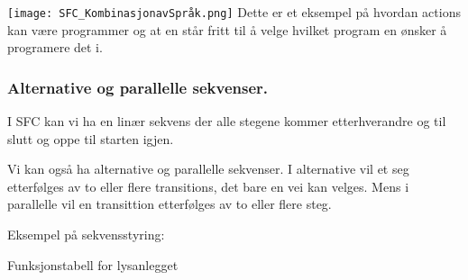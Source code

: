\texttt{[image: SFC\_KombinasjonavSpråk.png]}
\vskip 2.5pt 
Dette er et eksempel på hvordan actions kan være programmer og at en står fritt til å velge hvilket program en ønsker å programere det i. 
\subsubsection{Alternative og parallelle sekvenser. }

I SFC kan vi ha en linær sekvens der alle stegene kommer etterhverandre
og til slutt og oppe til starten igjen. 

Vi kan også ha alternative og parallelle sekvenser. I alternative
vil et seg etterfølges av to eller flere transitions, det bare en
vei kan velges. Mens i parallelle vil en transittion etterfølges av
to eller flere steg. 


Eksempel på sekvensstyring:

\begin{center}
\par\end{center}

Funksjonstabell for lysanlegget

\begin{center}
\par\end{center}


















